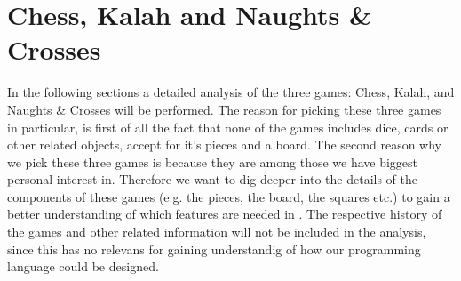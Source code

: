 \section{Chess, Kalah and Naughts \& Crosses}

In the following sections a detailed analysis of the three games: Chess, Kalah, and Naughts \& Crosses will be performed. The reason for picking these three games in particular, is first of all the fact that none of the games includes dice, cards or other related objects, accept for it's pieces and a board. The second reason why we pick these three games is because they are among those we have biggest personal interest in. Therefore we want to dig deeper into the details of the components of these games (e.g. the pieces, the board, the squares etc.) to gain a better understanding of which features are needed in \productname. The respective history of the games and other related information will not be included in the analysis, since this has no relevans for gaining understandig of how our programming language could be designed.  




      
